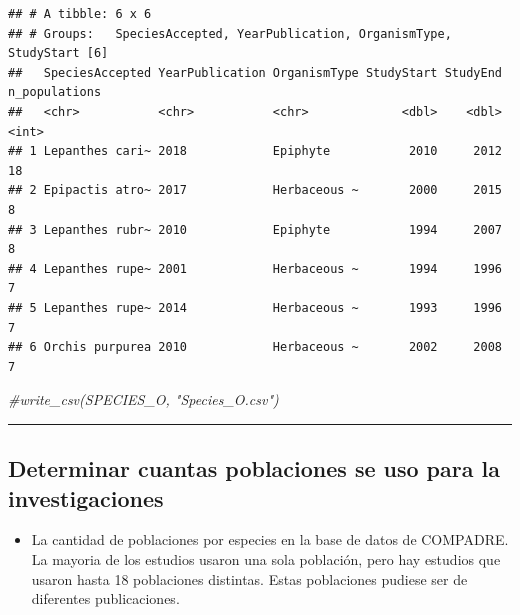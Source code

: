 \documentclass[
]{book}
\newenvironment{Shaded}{\begin{snugshade}}{\end{snugshade}}
\newcommand{\CommentTok}[1]{\textcolor[rgb]{0.56,0.35,0.01}{\textit{#1}}}
\newcommand{\FunctionTok}[1]{\textcolor[rgb]{0.13,0.29,0.53}{\textbf{#1}}}
\newcommand{\NormalTok}[1]{#1}
\newcommand{\SpecialCharTok}[1]{\textcolor[rgb]{0.81,0.36,0.00}{\textbf{#1}}}
\providecommand{\tightlist}{%
  \setlength{\itemsep}{0pt}\setlength{\parskip}{0pt}}
\theoremstyle{definition}
\theoremstyle{definition}
\theoremstyle{definition}
\theoremstyle{definition}
\theoremstyle{remark}
\begin{document}
\begin{verbatim}
## # A tibble: 6 x 6
## # Groups:   SpeciesAccepted, YearPublication, OrganismType, StudyStart [6]
##   SpeciesAccepted YearPublication OrganismType StudyStart StudyEnd n_populations
##   <chr>           <chr>           <chr>             <dbl>    <dbl>         <int>
## 1 Lepanthes cari~ 2018            Epiphyte           2010     2012            18
## 2 Epipactis atro~ 2017            Herbaceous ~       2000     2015             8
## 3 Lepanthes rubr~ 2010            Epiphyte           1994     2007             8
## 4 Lepanthes rupe~ 2001            Herbaceous ~       1994     1996             7
## 5 Lepanthes rupe~ 2014            Herbaceous ~       1993     1996             7
## 6 Orchis purpurea 2010            Herbaceous ~       2002     2008             7
\end{verbatim}

\begin{Shaded}
\begin{Highlighting}[]
\CommentTok{\#write\_csv(SPECIES\_O, "Species\_O.csv")}
\end{Highlighting}
\end{Shaded}

\begin{center}\rule{0.5\linewidth}{0.5pt}\end{center}

\subsection{Determinar cuantas poblaciones se uso para la investigaciones}\label{determinar-cuantas-poblaciones-se-uso-para-la-investigaciones}

\begin{itemize}
\tightlist
\item
  La cantidad de poblaciones por especies en la base de datos de COMPADRE. La mayoria de los estudios usaron una sola población, pero hay estudios que usaron hasta 18 poblaciones distintas. Estas poblaciones pudiese ser de diferentes publicaciones.
\end{itemize}

\begin{Shaded}
\end{Shaded}
\end{document}
